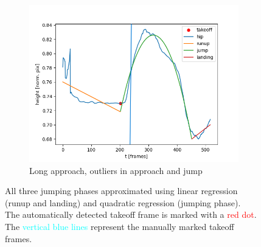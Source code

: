 \begin{figure}[h!]
\begin{subfigure}{0.45\textwidth}
        \includegraphics[width=\textwidth]{regression_poor_approach_jump.png}
        \caption{Long approach, outliers in approach and jump}
    \end{subfigure}
    \caption[Automatic takeoff frame detection results]{
        All three jumping phases approximated using linear regression
        (runup and landing) and quadratic regression (jumping phase).\\
        The automatically detected takeoff frame is marked with a
        \textcolor{red}{red dot}.\\
        The \textcolor{cyan}{vertical blue lines} represent the manually marked
        takeoff frames.}
\label{fig:4_automatic_takeoff_results}
\end{figure}
\FloatBarrier

